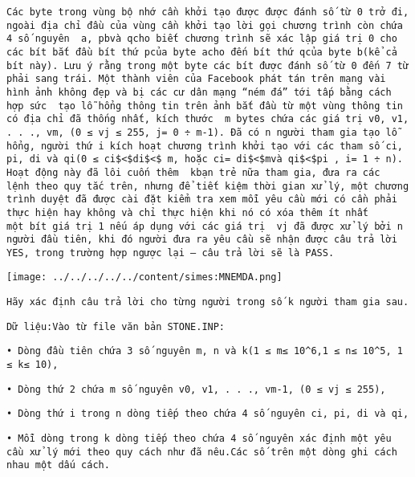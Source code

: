 \begin{verbatim}
Các byte trong vùng bộ nhớ cần khởi tạo được được đánh số từ 0 trở đi, ngoài địa chỉ đầu của vùng cần khởi tạo lời gọi chương trình còn chứa 4 số nguyên  a, pbvà qcho biết chương trình sẽ xác lập giá trị 0 cho các bít bắt đầu bít thứ pcủa byte acho đến bít thứ qcủa byte b(kể cả bít này). Lưu ý rằng trong một byte các bít được đánh số từ 0 đến 7 từ phải sang trái. Một thành viên của Facebook phát tán trên mạng vài hình ảnh không đẹp và bị các cư dân mạng “ném đá” tới tấp bằng cách hợp sức  tạo lỗ hổng thông tin trên ảnh bắt đầu từ một vùng thông tin có địa chỉ đã thống nhất, kích thước  m bytes chứa các giá trị v0, v1, . . ., vm, (0 ≤ vj ≤ 255, j= 0 ÷ m-1). Đã có n người tham gia tạo lỗ hổng, người thứ i kích hoạt chương trình khởi tạo với các tham số ci, pi, di và qi(0 ≤ ci$<$di$<$ m, hoặc ci= di$<$mvà qi$<$pi , i= 1 ÷ n). Hoạt động này đã lôi cuốn thêm  kbạn trẻ nữa tham gia, đưa ra các lệnh theo quy tắc trên, nhưng để tiết kiệm thời gian xử lý, một chương trình duyệt đã được cài đặt kiểm tra xem mỗi yêu cầu mới có cần phải thực hiện hay không và chỉ thực hiện khi nó có xóa thêm ít nhất một bít giá trị 1 nếu áp dụng với các giá trị  vj đã được xử lý bởi n người đầu tiên, khi đó người đưa ra yêu cầu sẽ nhận được câu trả lời YES, trong trường hợp ngược lại – câu trả lời sẽ là PASS.\end{verbatim}
\texttt{[image: ../../../../../content/simes:MNEMDA.png]}
\begin{verbatim}
Hãy xác định câu trả lời cho từng người trong số k người tham gia sau.\end{verbatim}
\begin{verbatim}
Dữ liệu:Vào từ file văn bản STONE.INP:\end{verbatim}
\begin{verbatim}
• Dòng đầu tiên chứa 3 số nguyên m, n và k(1 ≤ m≤ 10^6,1 ≤ n≤ 10^5, 1 ≤ k≤ 10),\end{verbatim}
\begin{verbatim}
• Dòng thứ 2 chứa m số nguyên v0, v1, . . ., vm-1, (0 ≤ vj ≤ 255),\end{verbatim}
\begin{verbatim}
• Dòng thứ i trong n dòng tiếp theo chứa 4 số nguyên ci, pi, di và qi,\end{verbatim}
\begin{verbatim}
• Mỗi dòng trong k dòng tiếp theo chứa 4 số nguyên xác định một yêu cầu xử lý mới theo quy cách như đã nêu.Các số trên một dòng ghi cách nhau một dấu cách.\end{verbatim}
